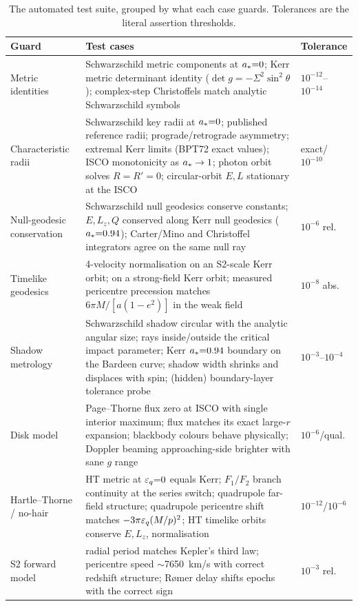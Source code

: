 \begin{table}
\centering
\caption{The automated test suite, grouped by what each case guards.
Tolerances are the literal assertion thresholds.}
\label{tab:tests}
\footnotesize
\begin{tabular}{p{}p{}l}
\toprule
Guard & Test cases & Tolerance \\
\midrule
Metric identities
& Schwarzschild metric components at $a_*{=}0$; Kerr metric
determinant identity ($\det g = -\Sigma^2\sin^2\theta$); complex-step
Christoffels match analytic Schwarzschild symbols
& $10^{-12}$--$10^{-14}$ \\[3pt]
Characteristic radii
& Schwarzschild key radii at $a_*{=}0$; published reference radii;
prograde/retrograde asymmetry; extremal Kerr limits (BPT72 exact
values); ISCO monotonicity as $a_*\to1$; photon orbit solves
$R{=}R'{=}0$; circular-orbit $E, L$ stationary at the ISCO
& exact/$10^{-10}$ \\[3pt]
Null-geodesic conservation
& Schwarzschild null geodesics conserve constants; $E, L_z, Q$
conserved along Kerr null geodesics ($a_*{=}0.94$); Carter/Mino and
Christoffel integrators agree on the same null ray
& $10^{-6}$ rel. \\[3pt]
Timelike geodesics
& 4-velocity normalisation on an S2-scale Kerr orbit; on a strong-field
Kerr orbit; measured pericentre precession matches
$6\pi M/[a(1-e^2)]$ in the weak field
& $10^{-8}$ abs. \\[3pt]
Shadow metrology
& Schwarzschild shadow circular with the analytic angular size; rays
inside/outside the critical impact parameter; Kerr $a_*{=}0.94$
boundary on the Bardeen curve; shadow width shrinks and displaces with
spin; (hidden) boundary-layer tolerance probe
& $10^{-3}$--$10^{-4}$ \\[3pt]
Disk model
& Page--Thorne flux zero at ISCO with single interior maximum; flux
matches its exact large-$r$ expansion; blackbody colours behave
physically; Doppler beaming approaching-side brighter with sane $g$
range
& $10^{-6}$/qual. \\[3pt]
Hartle--Thorne / no-hair
& HT metric at $\varepsilon_q{=}0$ equals Kerr; $F_1/F_2$ branch continuity at
the series switch; quadrupole far-field structure; quadrupole
pericentre shift matches $-3\pi\varepsilon_q(M/p)^2$; HT timelike orbits
conserve $E, L_z$, normalisation
& $10^{-12}$/$10^{-6}$ \\[3pt]
S2 forward model
& radial period matches Kepler's third law; pericentre speed
$\sim$7650~km/s with correct redshift structure; R{\o}mer delay shifts
epochs with the correct sign
& $10^{-3}$ rel. \\
\bottomrule
\end{tabular}
\end{table}

